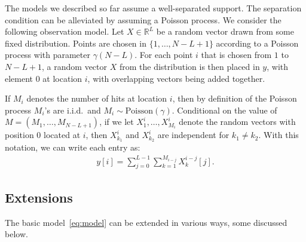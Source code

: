 \documentclass[12pt]{article}
\newcommand{\1}{\mathbf{1}}
\newcommand{\Poisson}{\text{Poisson}}
\newcommand{\TODO}[1]{{\color{red}{[#1]}}}
\newcommand{\RL}{\mathbb{R}^L}
\theoremstyle{plain}
\theoremstyle{definition}
\theoremstyle{remark}
\theoremstyle{plain}
\theoremstyle{remark}
\theoremstyle{plain}
\theoremstyle{plain}
\theoremstyle{plain}
\numberwithin{equation}{section}
\begin{document}
\TODO{For the heterogeneous case.} 

The models we described so far assume a well-separated support. The separation condition can be alleviated by assuming a Poisson process. 
We consider the following observation model. Let $X \in\RL$ be a random vector drawn from some fixed distribution.
Points are chosen in $\{1,\dots,N-L+1\}$ according to a Poisson process with parameter $\gamma (N-L)$. %
For each point $i$ that is chosen from $1$ to $N-L+1$, a random vector $X$ from the distribution is then placed in $y$, with element $0$ at location $i$, with overlapping vectors being added together. 

If $M_i$ denotes the number of hits at location $i$,  then by definition of the Poisson process $M_i$'s are i.i.d.\ and $M_i \sim \Poisson(\gamma)$. Conditional on the value of $M = (M_1,\dots,M_{N-L+1})$, if we let $X_1^{i},\dots,X_{M_i}^i$ denote the random vectors with position 0 located at $i$, then $X_{k_1}^{i}$ and $X_{k_2}^{i}$ are independent for $k_1 \ne k_2$.
With this notation, we can write each entry as:
%
\begin{align}
%
y[i] = \sum_{j=0}^{L-1} \sum_{k=1}^{M_{i-j}} X_k^{i-j}[j].
%
\end{align}
 
\subsection{Extensions} \label{sec:extensions}

\TODO{multi-dimensions}

The basic model~\eqref{eq:model} can be extended in various ways, some discussed below.
%
%
\end{document}
